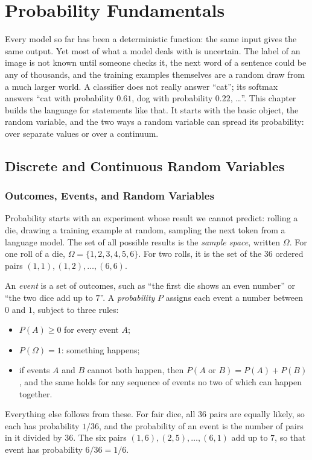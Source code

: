 \chapter{Probability Fundamentals}
\label{chap:ch05}


Every model so far has been a deterministic function: the same input
gives the same output. Yet most of what a model deals with is uncertain.
The label of an image is not known until someone checks it, the next word
of a sentence could be any of thousands, and the training examples
themselves are a random draw from a much larger world. A classifier does
not really answer ``cat''; its softmax answers ``cat with probability
$0.61$, dog with probability $0.22$, \dots''. This chapter builds the
language for statements like that. It starts with the basic object,
the random variable, and the two ways a random variable can spread its
probability: over separate values or over a continuum.

\section{Discrete and Continuous Random Variables}
\label{sec:ch05-rv}

\subsection{Outcomes, Events, and Random Variables}
\label{sec:ch05-rv-def}

Probability starts with an experiment whose result we cannot predict:
rolling a die, drawing a training example at random, sampling the next
token from a language model. The set of all possible results is the
\emph{sample space}, written $\Omega$. For one roll of a die,
$\Omega = \{1, 2, 3, 4, 5, 6\}$. For two rolls, it is the set of the
$36$ ordered pairs $(1, 1), (1, 2), \dots, (6, 6)$.

An \emph{event} is a set of outcomes, such as ``the first die shows an
even number'' or ``the two dice add up to $7$''. A \emph{probability}
$P$ assigns each event a number between $0$ and $1$, subject to three
rules:
\begin{itemize}
  \item $P(A) \ge 0$ for every event $A$;
  \item $P(\Omega) = 1$: something happens;
  \item if events $A$ and $B$ cannot both happen, then
    $P(A \text{ or } B) = P(A) + P(B)$, and the same holds for any
    sequence of events no two of which can happen together.
\end{itemize}
Everything else follows from these. For fair dice, all $36$ pairs are
equally likely, so each has probability $1/36$, and the probability of
an event is the number of pairs in it divided by $36$. The six pairs
$(1, 6), (2, 5), \dots, (6, 1)$ add up to $7$, so that event has
probability $6/36 = 1/6$.

